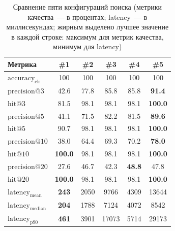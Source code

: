\begin{table}[H]
\caption{Сравнение пяти конфигураций поиска (метрики качества~--- в процентах; latency~--- в миллисекундах; жирным выделено лучшее значение в каждой строке: максимум для метрик качества, минимум для latency)}
\label{tab:eval-comparison}
\renewcommand{\arraystretch}{1.20}
\setlength{\tabcolsep}{4pt}
\footnotesize
\begin{tabularx}{\textwidth}{|>{\raggedright\arraybackslash}X|c|c|c|c|c|} \hline
\textbf{Метрика} & \textbf{\#1} & \textbf{\#2} & \textbf{\#3} & \textbf{\#4} & \textbf{\#5} \\ \hline
$\mathrm{accuracy}_{\mathrm{cls}}$ & 100 & 100 & 100 & 100 & 100 \\ \hline
$\mathrm{precision}@3$ & 42.6 & 77.8 & 85.8 & 85.8 & \textbf{91.4} \\ \hline
$\mathrm{hit}@3$ & 81.5 & 98.1 & 98.1 & 98.1 & \textbf{100.0} \\ \hline
$\mathrm{precision}@5$ & 41.1 & 71.5 & 82.2 & 81.5 & \textbf{89.6} \\ \hline
$\mathrm{hit}@5$ & 90.7 & 98.1 & 98.1 & 98.1 & \textbf{100.0} \\ \hline
$\mathrm{precision}@10$ & 38.0 & 64.4 & 69.3 & 70.2 & \textbf{78.0} \\ \hline
$\mathrm{hit}@10$ & \textbf{100.0} & 98.1 & 98.1 & 98.1 & \textbf{100.0} \\ \hline
$\mathrm{precision}@20$ & 27.6 & 46.7 & 42.3 & \textbf{48.8} & 47.8 \\ \hline
$\mathrm{hit}@20$ & \textbf{100.0} & 98.1 & 98.1 & 98.1 & \textbf{100.0} \\ \hline
$\mathrm{latency}_{\mathrm{mean}}$ & \textbf{243} & 2050 & 9766 & 4309 & 13644 \\ \hline
$\mathrm{latency}_{\mathrm{median}}$ & \textbf{204} & 1788 & 7124 & 4072 & 8542 \\ \hline
$\mathrm{latency}_{\mathrm{p90}}$ & \textbf{461} & 3901 & 17073 & 5714 & 29173 \\ \hline
\end{tabularx}
\end{table}

